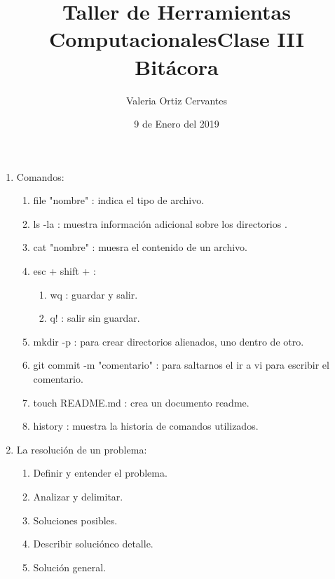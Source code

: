 \documentclass[letterpaper, 12pt, oneside]{article} %
\title{\Huge Taller de Herramientas Computacionales}
\author{Valeria Ortiz Cervantes}
\date{9 de Enero del 2019}
\begin{document}
	\maketitle
	\newpage
	\title{Clase III\\Bitácora\\}
	\begin{enumerate}
		\item Comandos: 
		\begin{enumerate}
			\item file "nombre" : indica el tipo de archivo.
			\item ls -la : muestra información adicional sobre los directorios .
			\item cat "nombre" : muesra el contenido de un archivo.
			\item esc + shift + : 
			\begin{enumerate}
				\item wq : guardar y salir.
				\item q! : salir sin guardar.
			\end{enumerate}
			\item mkdir -p : para crear directorios alienados, uno dentro de otro.
			\item git commit -m "comentario" : para saltarnos el ir a vi para escribir el comentario.
			\item touch README.md : crea un documento readme.
			\item history : muestra la historia de comandos utilizados.
		\end{enumerate}
		\item La resolución de un problema:
		\begin{enumerate}
			\item Definir y entender el problema.
			\item Analizar y delimitar.
			\item Soluciones posibles.
			\item Describir soluciónco detalle.
			\item Solución general.
		\end{enumerate}
	\end{enumerate}
\end{document}
